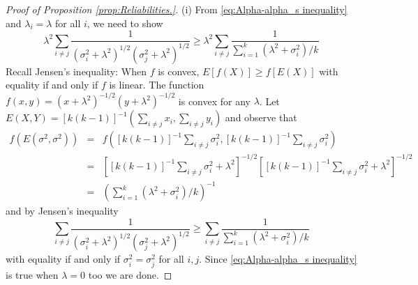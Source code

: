 \documentclass[twoside]{article}
\renewcommand{\sqrt}[1]{{(#1)^{1/2}}}
\begin{document}
\begin{proof}[Proof of Proposition \ref{prop:Reliabilities.}]\label{proof:Reliabilities.}
(i) From \eqref{eq:Alpha-alpha_s inequality} and $\lambda_{i}=\lambda$
for all $i$, we need to show
\[
\lambda^{2}\sum_{i\neq j}\frac{1}{\sqrt{\sigma_{i}^{2}+\lambda^{2}}\sqrt{\sigma_{j}^{2}+\lambda^{2}}}\geq\lambda^{2}\sum_{i\neq j}\frac{1}{\sum_{i=1}^{k}\left(\lambda^{2}+\sigma_{i}^{2}\right)/k}
\]
Recall Jensen's inequality: When $f$ is convex, $E\left[f\left(X\right)\right]\geq f\left[E\left(X\right)\right]$ with equality if and only if $f$ is linear.
The function $f\left(x,y\right)=\left(x+\lambda^{2}\right)^{-1/2}\left(y+\lambda^{2}\right)^{-1/2}$
is convex for any $\lambda$. Let $E\left(X,Y\right)=\left[k\left(k-1\right)\right]^{-1}\left(\sum_{i\neq j}x_{i},\sum_{i\neq j}y_{i}\right)$
and observe that
\begin{eqnarray*}
f\left(E\left(\sigma^{2},\sigma^{2}\right)\right) & = & f\left(\left[k\left(k-1\right)\right]^{-1}\sum_{i\neq j}\sigma_{i}^{2},\left[k\left(k-1\right)\right]^{-1}\sum_{i\neq j}\sigma_{i}^{2}\right)\\
 & = & \left[\left[k\left(k-1\right)\right]^{-1}\sum_{i\neq j}\sigma_{i}^{2}+\lambda^{2}\right]^{-1/2}\left[\left[k\left(k-1\right)\right]^{-1}\sum_{i\neq j}\sigma_{i}^{2}+\lambda^{2}\right]^{-1/2}\\
 & = & \left(\sum_{i=1}^{k}\left(\lambda^{2}+\sigma_{i}^{2}\right)/k\right)^{-1}
\end{eqnarray*}
and by Jensen's inequality
\[
\sum_{i\neq j}\frac{1}{\sqrt{\sigma_{i}^{2}+\lambda^{2}}\sqrt{\sigma_{j}^{2}+\lambda^{2}}}\geq\sum_{i\neq j}\frac{1}{\sum_{i=1}^{k}\left(\lambda^{2}+\sigma_{i}^{2}\right)/k}
\]
with equality if and only if $\sigma_{i}^{2}=\sigma_{j}^{2}$ for
all $i,j$. Since \eqref{eq:Alpha-alpha_s inequality} is true when
$\lambda=0$ too we are done.


\end{proof}
\end{document}
